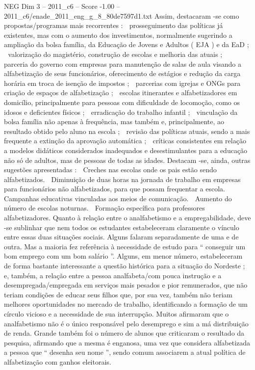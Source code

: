 \begin{textsample}{NEG Dim 3 – 2011\_c6 – Score -1.00 – 2011\_c6/enade\_2011\_eng\_g\_8\_80de7597d1.txt}
Assim, destacaram -se como propostas/programas mais recorrentes :  prosseguimento das políticas já existentes, mas com o aumento dos investimentos, normalmente sugerindo a ampliação da bolsa família, da Educação de Jovens e Adultos ( EJA ) e da EaD ;  valorização do magistério, construção de escolas e melhoria das atuais ;  parceria do governo com empresas para manutenção de salas de aula visando a alfabetização de seus funcionários, oferecimento de estágios e redução da carga horária em troca de isenção de impostos ;  parcerias com igrejas e ONGs para criação de espaços de alfabetização ;  escolas itinerantes e alfabetizadores em domicílio, principalmente para pessoas com dificuldade de locomoção, como os idosos e deficientes físicos ;  erradicação do trabalho infantil ;  vinculação da bolsa família não apenas à frequência, mas também e, principalmente, ao resultado obtido pelo aluno na escola ;  revisão das políticas atuais, sendo a mais frequente a extinção da aprovação automática ;  críticas consistentes em relação a modelos didáticos considerados inadequados e desestimulantes para a educação não só de adultos, mas de pessoas de todas as idades.
Destacam -se, ainda, outras sugestões apresentadas :  Creches nas escolas onde os pais estão sendo alfabetizados.  Diminuição de duas horas na jornada de trabalho em empresas para funcionários não alfabetizados, para que possam frequentar a escola.  Campanhas educativas vinculadas aos meios de comunicação.  Aumento do número de escolas noturnas.  Formação específica para professores alfabetizadores.
Quanto à relação entre o analfabetismo e a empregabilidade, deve -se sublinhar que nem todos os estudantes estabeleceram claramente o vínculo entre essas duas situações sociais.
Alguns falaram separadamente de uma e de outra.
Mas a maioria fez referência à necessidade de estudo para “ conseguir um bom emprego com um bom salário ”.
Alguns, em menor número, estabeleceram de forma bastante interessante a questão histórica para a situação do Nordeste ; e, também, a relação entre a pessoa analfabeta/com pouca instrução e a desempregada/empregada em serviços mais pesados e pior remunerados, que não teriam condições de educar seus filhos que, por sua vez, também não teriam melhores oportunidades no mercado de trabalho, identificando a formação de um círculo vicioso e a necessidade de sua interrupção.
Muitos afirmaram que o analfabetismo não é o único responsável pelo desemprego e sim a má distribuição de renda.
Grande também foi o número de alunos que criticaram o resultado da pesquisa, afirmando que a mesma é enganosa, uma vez que considera alfabetizada a pessoa que “ desenha seu nome ”, sendo comum associarem a atual política de alfabetização com ganhos eleitorais.

\end{textsample}

